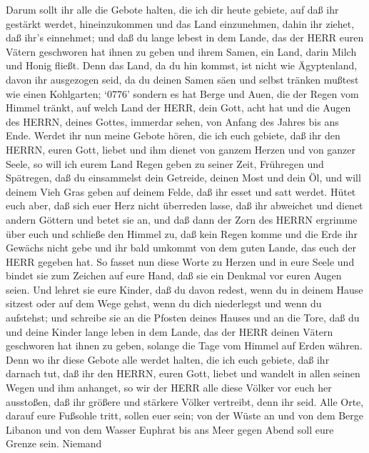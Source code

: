  Darum sollt ihr alle die Gebote halten, die ich dir heute
gebiete, auf daß ihr gestärkt werdet, hineinzukommen und das Land
einzunehmen, dahin ihr ziehet, daß ihr's einnehmet;  und daß
du lange lebest in dem Lande, das der HERR euren Vätern geschworen hat
ihnen zu geben und ihrem Samen, ein Land, darin Milch und Honig fließt.
 Denn das Land, da du hin kommst, ist nicht wie
Ägyptenland, davon ihr ausgezogen seid, da du deinen Samen säen und
selbst tränken mußtest wie einen Kohlgarten;  `0776'
sondern es hat Berge und Auen, die der Regen vom Himmel tränkt,
 auf welch Land der HERR, dein Gott, acht hat und die Augen
des HERRN, deines Gottes, immerdar sehen, von Anfang des Jahres bis ans
Ende.  Werdet ihr nun meine Gebote hören, die ich euch
gebiete, daß ihr den HERRN, euren Gott, liebet und ihm dienet von ganzem
Herzen und von ganzer Seele,  so will ich eurem Land Regen
geben zu seiner Zeit, Frühregen und Spätregen, daß du einsammelst dein
Getreide, deinen Most und dein Öl,  und will deinem Vieh
Gras geben auf deinem Felde, daß ihr esset und satt werdet.
 Hütet euch aber, daß sich euer Herz nicht überreden lasse,
daß ihr abweichet und dienet andern Göttern und betet sie an,
 und daß dann der Zorn des HERRN ergrimme über euch und
schließe den Himmel zu, daß kein Regen komme und die Erde ihr Gewächs
nicht gebe und ihr bald umkommt von dem guten Lande, das euch der HERR
gegeben hat.  So fasset nun diese Worte zu Herzen und in
eure Seele und bindet sie zum Zeichen auf eure Hand, daß sie ein Denkmal
vor euren Augen seien.  Und lehret sie eure Kinder, daß du
davon redest, wenn du in deinem Hause sitzest oder auf dem Wege gehst,
wenn du dich niederlegst und wenn du aufstehst;  und
schreibe sie an die Pfosten deines Hauses und an die Tore, 
daß du und deine Kinder lange leben in dem Lande, das der HERR deinen
Vätern geschworen hat ihnen zu geben, solange die Tage vom Himmel auf
Erden währen.  Denn wo ihr diese Gebote alle werdet halten,
die ich euch gebiete, daß ihr darnach tut, daß ihr den HERRN, euren
Gott, liebet und wandelt in allen seinen Wegen und ihm anhanget,
 so wir der HERR alle diese Völker vor euch her ausstoßen,
daß ihr größere und stärkere Völker vertreibt, denn ihr seid.
 Alle Orte, darauf eure Fußsohle tritt, sollen euer sein;
von der Wüste an und von dem Berge Libanon und von dem Wasser Euphrat
bis ans Meer gegen Abend soll eure Grenze sein.  Niemand
